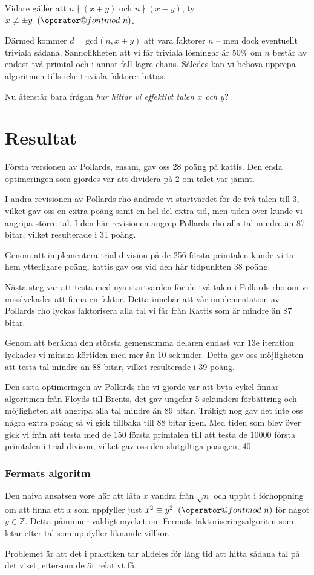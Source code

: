 \documentclass[a4paper,12pt]{article}
\makeatletter
\def\imod#1{\allowbreak\mkern10mu({\operator@font mod}\,\,#1)}
\renewcommand{\*}{\ensuremath{\cdot}}
\makeatother
\begin{document}
Vidare gäller att $n \nmid (x+y)$ och $n \nmid (x-y)$, ty $x \not\equiv \pm y
\imod{n}$. 

Därmed kommer $d = \text{gcd}\left( n, x \pm y \right)$ att vara faktorer  $n$
-- men dock eventuellt triviala sådana. Sannolikheten att vi får triviala
lösningar är $50 \%$ om $n$ består av endast två primtal och i annat fall lägre
chans. Således kan vi behöva upprepa algoritmen tills icke-triviala faktorer
hittas.

Nu återstår bara frågan \emph{hur hittar vi effektivt talen $x$ och $y$}?

\section{Resultat}

Första versionen av Pollards, ensam, gav oss 28 poäng på kattis. Den enda optimeringen som gjordes var att dividera på 2 om talet var jämnt.

I andra revisionen av Pollards rho ändrade vi startvärdet för de två talen till 3, vilket gav oss en extra poäng samt en hel del extra tid, men tiden över kunde vi angripa större tal. I den här revisionen angrep Pollards rho alla tal mindre än 87 bitar, vilket resulterade i 31 poäng.

Genom att implementera trial division på de 256 första primtalen kunde vi ta hem ytterligare poäng, kattis gav oss vid den här tidpunkten 38 poäng.

Nästa steg var att testa med nya startvärden för de två talen i Pollards rho om vi misslyckades att finna en faktor. Detta innebär att vår implementation av Pollards rho lyckas faktorisera alla tal vi får från Kattis som är mindre än 87 bitar.

Genom att beräkna den största gemensamma delaren endast var 13e iteration lyckades vi minska körtiden med mer än 10 sekunder. Detta gav oss möjligheten att testa tal mindre än 88 bitar, vilket resulterade i 39 poäng.

Den sista optimeringen av Pollards rho vi gjorde var att byta cykel-finnar-algoritmen från Floyds till Brents, det gav ungefär 5 sekunders förbättring och möjligheten att angripa alla tal mindre än 89 bitar. Tråkigt nog gav det inte oss några extra poäng så vi gick tillbaka till 88 bitar igen. Med tiden som blev över gick vi från att testa med de 150 första primtalen till att testa de 10000 första primtalen i trial divison, vilket gav oss den slutgiltiga poängen, 40.

\subsubsection{Fermats algoritm}

Den naiva ansatsen vore här att låta $x$ vandra från $\sqrt{n}$ och uppåt i
förhoppning om att finna ett $x$ som uppfyller just $x^2 \equiv y^2 \imod{n}$
för något $y \in \mathbb{Z}$. Detta påminner väldigt mycket om Fermats
faktoriseringsalgoritm som letar efter tal som uppfyller liknande villkor.

Problemet är att det i praktiken tar alldeles för lång tid att hitta sådana tal
på det viset, eftersom de är relativt få.
\end{document}
